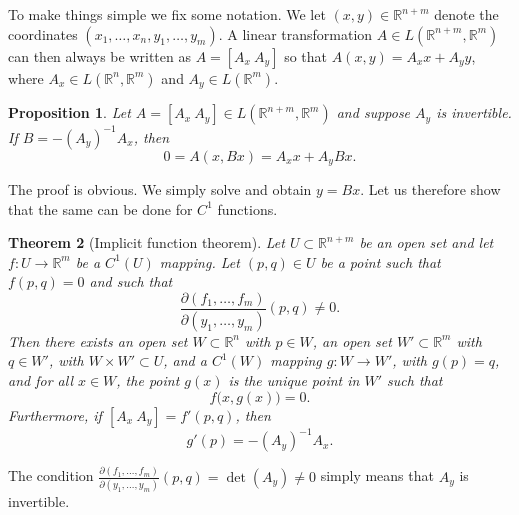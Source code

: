 \documentclass[12pt]{book}
\newcommand{\R}{{\mathbb{R}}}
\theoremstyle{plain}
\newtheorem{thm}{Theorem}[section]
\newtheorem{prop}[thm]{Proposition}
\theoremstyle{remark}
\theoremstyle{definition}
\theoremstyle{exercise}
\theoremstyle{example}
\begin{document}
To make things simple we fix some notation.  We let $(x,y) \in
\R^{n+m}$ denote the coordinates $(x_1,\ldots,x_n,y_1,\ldots,y_m)$.  A
linear transformation $A \in L(\R^{n+m},\R^m)$ can then always
be written as
$A = [ A_x ~ A_y ]$ so that $A(x,y) = A_x x + A_y y$,
where $A_x \in L(\R^n,\R^m)$ and
$A_y \in L(\R^m)$.

\begin{prop}
Let $A = [A_x~A_y] \in L(\R^{n+m},\R^m)$ and suppose 
$A_y$ is invertible.  If $B = - {(A_y)}^{-1} A_x$, then
\begin{equation*}
0 = A ( x, Bx) = A_x x + A_y Bx .
\end{equation*}
\end{prop}

The proof is obvious.  We simply solve and obtain $y = Bx$.  Let us
therefore show that the same can be done for $C^1$ functions.

\begin{thm}[Implicit function theorem]
\label{thm:implicit}
Let $U \subset \R^{n+m}$ be an open set and let $f \colon U \to \R^m$
be a $C^1(U)$ mapping.  Let $(p,q) \in U$ be a point such that
$f(p,q) = 0$ and such that
\begin{equation*}
\frac{\partial(f_1,\ldots,f_m)}{\partial(y_1,\ldots,y_m)} (p,q)  \neq 0 .
\end{equation*}
Then there exists an
open set $W \subset \R^n$ with $p \in W$,
an open set $W' \subset \R^m$ with $q \in W'$,
with $W \times W' \subset U$,
and
a $C^1(W)$ mapping $g \colon W \to W'$, with $g(p) = q$, and
for all $x \in W$, the point $g(x)$ is the unique point in $W'$
such that 
\begin{equation*}
f\bigl(x,g(x)\bigr) = 0 .
\end{equation*}
Furthermore, if $[ A_x ~ A_y ] = f'(p,q)$, then
\begin{equation*}
g'(p) = -{(A_y)}^{-1}A_x .
\end{equation*}
\end{thm}


The condition
$\frac{\partial(f_1,\ldots,f_m)}{\partial(y_1,\ldots,y_m)} (p,q) =
\det(A_y)  \neq 0$
simply means that $A_y$ is invertible.
\end{document}

